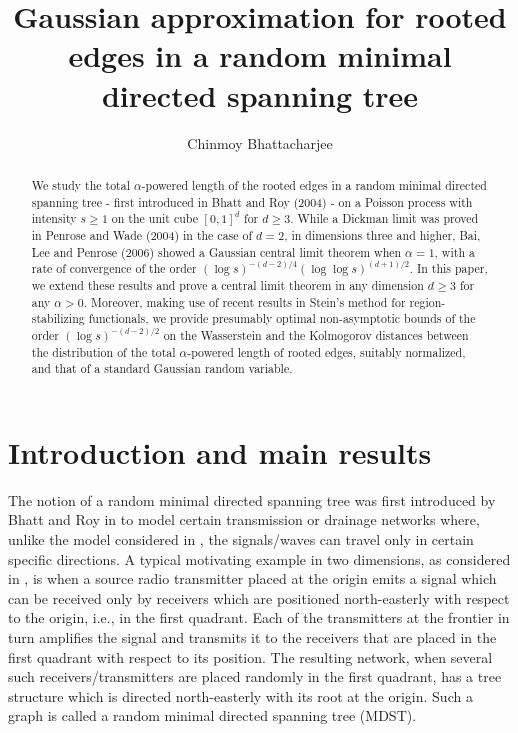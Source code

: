 \documentclass[11pt,reqno]{amsart}
\title[Gaussian approximation in a random minimal directed spanning tree]{Gaussian approximation for rooted edges in a random minimal directed spanning tree}
\author[C. Bhattacharjee]{Chinmoy Bhattacharjee}
\numberwithin{equation}{section}
\theoremstyle{definition}
\begin{document}
\maketitle

\begin{abstract} We study the total $\alpha$-powered length of the rooted edges in a random minimal directed spanning tree - first introduced in Bhatt and Roy (2004) - on a Poisson process with intensity $s \ge 1$ on the unit cube $[0,1]^d$ for $d \ge 3$. While a Dickman limit was proved in Penrose and Wade (2004) in the case of $d=2$, in dimensions three and higher, Bai, Lee and Penrose (2006) showed a Gaussian central limit theorem when $\alpha=1$, with a rate of convergence of the order $(\log s)^{-(d-2)/4} (\log \log s)^{(d+1)/2}$. In this paper, we extend these results and prove a central limit theorem in any dimension $d \ge 3$ for any $\alpha>0$. Moreover, making use of recent results in Stein's method for region-stabilizing functionals, we provide presumably optimal non-asymptotic bounds of the order $(\log s)^{-(d-2)/2}$ on the Wasserstein and the Kolmogorov distances between the distribution of the total $\alpha$-powered length of rooted edges, suitably normalized, and that of a standard Gaussian random variable.
\end{abstract}

\begingroup
\hypersetup{linktocpage=false}
\setcounter{tocdepth}{2}
\endgroup



\section{Introduction and main results} The notion of a random minimal directed spanning tree was first introduced by Bhatt and Roy in \cite{BR04} to model certain transmission or drainage networks \cite{RR01} where, unlike the model considered in \cite{G61}, the signals/waves can travel only in certain specific directions. A typical motivating example in two dimensions, as considered in \cite{BR04}, is when a source radio transmitter placed at the origin emits a signal which can be received only by receivers which are positioned north-easterly with respect to the origin, i.e., in the first quadrant. Each of the transmitters at the frontier in turn amplifies the signal and transmits it to the receivers that are placed in the first quadrant with respect to its position. The resulting network, when several such receivers/transmitters are placed randomly in the first quadrant, has a tree structure which is directed north-easterly with its root at the origin. Such a graph is called a random minimal directed spanning tree (MDST).
\end{document}
